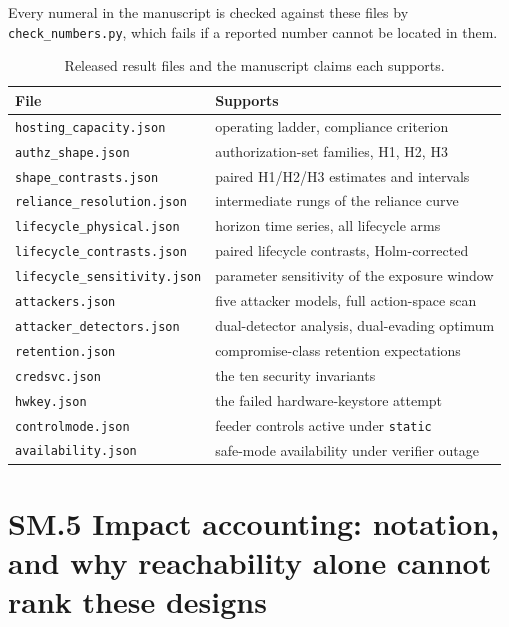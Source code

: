 \documentclass[review]{elsarticle}
\begin{document}
Every numeral in the manuscript is checked against these files by \texttt{check\_numbers.py},
which fails if a reported number cannot be located in them.

\begin{table}[h]
\centering
\caption{Released result files and the manuscript claims each supports.}
\label{tab:files}
\small
\begin{tabular}{@{}ll@{}}
\toprule
File & Supports \\
\midrule
\texttt{hosting\_capacity.json}      & operating ladder, compliance criterion \\
\texttt{authz\_shape.json}           & authorization-set families, H1, H2, H3 \\
\texttt{shape\_contrasts.json}       & paired H1/H2/H3 estimates and intervals \\
\texttt{reliance\_resolution.json}   & intermediate rungs of the reliance curve \\
\texttt{lifecycle\_physical.json}    & horizon time series, all lifecycle arms \\
\texttt{lifecycle\_contrasts.json}   & paired lifecycle contrasts, Holm-corrected \\
\texttt{lifecycle\_sensitivity.json} & parameter sensitivity of the exposure window \\
\texttt{attackers.json}              & five attacker models, full action-space scan \\
\texttt{attacker\_detectors.json}    & dual-detector analysis, dual-evading optimum \\
\texttt{retention.json}              & compromise-class retention expectations \\
\texttt{credsvc.json}                & the ten security invariants \\
\texttt{hwkey.json}                  & the failed hardware-keystore attempt \\
\texttt{controlmode.json}            & feeder controls active under \texttt{static} \\
\texttt{availability.json}           & safe-mode availability under verifier outage \\
\bottomrule
\end{tabular}
\end{table}


\section*{SM.5 Impact accounting: notation, and why reachability alone cannot rank these designs}
\end{document}

